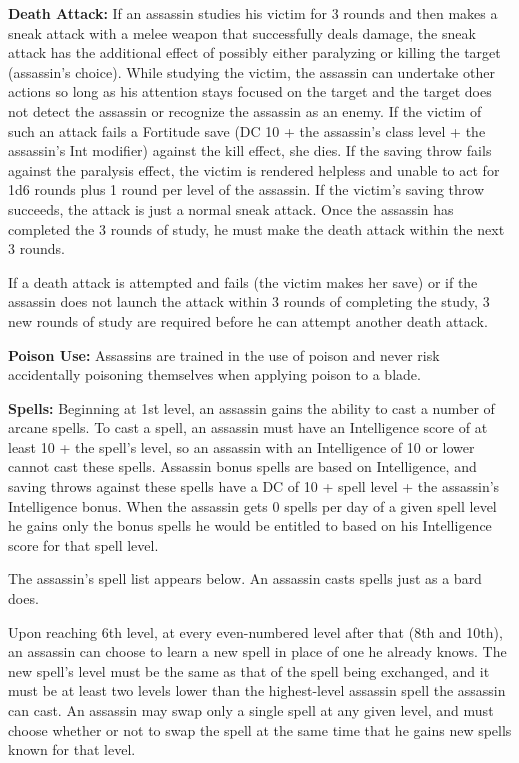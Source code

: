 \textbf{Death Attack:} If an assassin studies his victim for 3 rounds and then 
makes a sneak attack with a melee weapon that successfully deals damage, the sneak 
attack has the additional effect of possibly either paralyzing or killing the target 
(assassin's choice). While studying the victim, the assassin can undertake other 
actions so long as his attention stays focused on the target and the target does 
not detect the assassin or recognize the assassin as an enemy. If the victim of 
such an attack fails a Fortitude save (DC 10 + the assassin's class level + the 
assassin's Int modifier) against the kill effect, she dies. If the saving throw 
fails against the paralysis effect, the victim is rendered helpless and unable 
to act for 1d6 rounds plus 1 round per level of the assassin. If the victim's saving 
throw succeeds, the attack is just a normal sneak attack. Once the assassin has 
completed the 3 rounds of study, he must make the death attack within the next 
3 rounds.

If a death attack is attempted and fails (the victim makes her save) or if the 
assassin does not launch the attack within 3 rounds of completing the study, 3 
new rounds of study are required before he can attempt another death attack.

\textbf{Poison Use:} Assassins are trained in the use of poison and never risk 
accidentally poisoning themselves when applying poison to a blade.

\textbf{Spells:} Beginning at 1st level, an assassin gains the ability to cast 
a number of arcane spells. To cast a spell, an assassin must have an Intelligence 
score of at least 10 + the spell's level, so an assassin with an Intelligence of 
10 or lower cannot cast these spells. Assassin bonus spells are based on Intelligence, 
and saving throws against these spells have a DC of 10 + spell level + the assassin's 
Intelligence bonus. When the assassin gets 0 spells per day of a given spell level 
he gains only the bonus spells he would be entitled to based on his Intelligence 
score for that spell level.

The assassin's spell list appears below. An assassin casts spells just as a bard 
does.

Upon reaching 6th level, at every even-numbered level after that (8th and 10th), 
an assassin can choose to learn a new spell in place of one he already knows. The 
new spell's level must be the same as that of the spell being exchanged, and it 
must be at least two levels lower than the highest-level assassin spell the assassin 
can cast. An assassin may swap only a single spell at any given level, and must 
choose whether or not to swap the spell at the same time that he gains new spells 
known for that level.


